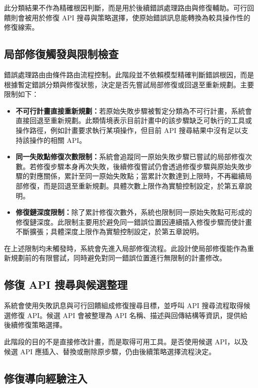 \begin{ZhChapter}
此分類結果不作為精確根因判斷，而是用於後續錯誤處理路由與修復輔助。可行回饋則會被用於修復 API 搜尋與策略選擇，使原始錯誤訊息能轉換為較具操作性的修復線索。

\subsection{局部修復觸發與限制檢查}

錯誤處理路由由條件路由流程控制。此階段並不依賴模型精確判斷錯誤根因，而是根據暫定錯誤分類與修復狀態，決定是否先嘗試局部修復或回退至重新規劃。主要限制如下：

\begin{itemize}
    \item \textbf{不可行計畫直接重新規劃：}若原始失敗步驟被暫定分類為不可行計畫，系統會直接回退至重新規劃。此類情境表示目前計畫中的該步驟缺乏可執行的工具或操作路徑，例如計畫要求執行某項操作，但目前 API 搜尋結果中沒有足以支持該操作的相關 API。
    \item \textbf{同一失敗點修復次數限制：}系統會追蹤同一原始失敗步驟已嘗試的局部修復次數。若修復步驟本身再次失敗，後續修復嘗試仍會透過修復步驟與原始失敗步驟的對應關係，累計至同一原始失敗點；當累計次數達到上限時，不再繼續局部修復，而是回退至重新規劃。具體次數上限作為實驗控制設定，於第五章說明。
    \item \textbf{修復鏈深度限制：}除了累計修復次數外，系統也限制同一原始失敗點可形成的修復鏈深度。此限制主要用於避免同一錯誤位置因連續插入修復步驟而使計畫不斷擴張；具體深度上限作為實驗控制設定，於第五章說明。
\end{itemize}

在上述限制均未觸發時，系統會先進入局部修復流程。此設計使局部修復能作為重新規劃前的有限嘗試，同時避免對同一錯誤位置進行無限制的計畫修改。

\subsection{修復 API 搜尋與候選整理}

系統會使用失敗訊息與可行回饋組成修復搜尋目標，並呼叫 API 搜尋流程取得候選修復 API。候選 API 會被整理為 API 名稱、描述與回傳結構等資訊，提供給後續修復策略選擇。

此階段的目的不是直接修改計畫，而是取得可用工具。是否使用候選 API，以及候選 API 應插入、替換或刪除原步驟，仍由後續策略選擇流程決定。

\subsection{修復導向經驗注入}


\end{ZhChapter}
